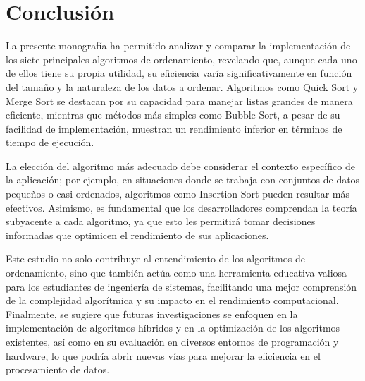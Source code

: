 \cleardoublepage
\section{Conclusión}

La presente monografía ha permitido analizar y comparar la implementación de los siete principales algoritmos de ordenamiento, revelando que, aunque cada uno de ellos tiene su propia utilidad, su eficiencia varía significativamente en función del tamaño y la naturaleza de los datos a ordenar. Algoritmos como Quick Sort y Merge Sort se destacan por su capacidad para manejar listas grandes de manera eficiente, mientras que métodos más simples como Bubble Sort, a pesar de su facilidad de implementación, muestran un rendimiento inferior en términos de tiempo de ejecución. 

La elección del algoritmo más adecuado debe considerar el contexto específico de la aplicación; por ejemplo, en situaciones donde se trabaja con conjuntos de datos pequeños o casi ordenados, algoritmos como Insertion Sort pueden resultar más efectivos. Asimismo, es fundamental que los desarrolladores comprendan la teoría subyacente a cada algoritmo, ya que esto les permitirá tomar decisiones informadas que optimicen el rendimiento de sus aplicaciones. 

Este estudio no solo contribuye al entendimiento de los algoritmos de ordenamiento, sino que también actúa como una herramienta educativa valiosa para los estudiantes de ingeniería de sistemas, facilitando una mejor comprensión de la complejidad algorítmica y su impacto en el rendimiento computacional. Finalmente, se sugiere que futuras investigaciones se enfoquen en la implementación de algoritmos híbridos y en la optimización de los algoritmos existentes, así como en su evaluación en diversos entornos de programación y hardware, lo que podría abrir nuevas vías para mejorar la eficiencia en el procesamiento de datos.